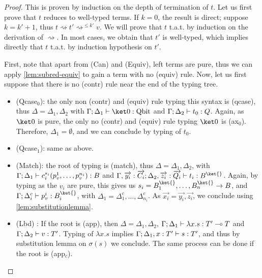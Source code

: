 \documentclass[10pt,a4paper]{article}
\newcommand{\bvar}{B}
\newcommand{\qvar}{Q}
\newcommand\bkvar{\bvar^{\ket{}}}
\newcommand{\bkvarb}{{\bkvar}}
\newcommand{\qbit}{\mathrm{Qbit}}
\newcommand{\linfunc}{\multimap}
\newcommand{\sign}[2]{\ifx&#1&
  \else
  #1 \to
  \fi
#2}
\newcommand{\zket}{\ket 0}
\newcommand{\lbd}[2]{\lambda #1 .#2}
\newcommand{\vartyping}[2]{#1 : #2}
\newcommand{\typing}[4]{
  \ifx&#1&\varnothing \else #1\fi; 
  \ifx&#2&\varnothing \else #2\fi 
  \vdash {#3} : #4
}
\newcommand{\reduces}{\rightsquigarrow}
\newcommand{\mostreduces}[1]{\ensuremath{\reduces^{\leq #1}}}
\begin{document}
\begin{proof}
  This is proven by induction on the depth of termination of $t$.
  Let us first prove that $t$ reduces to well-typed terms. If $k =
  0$, the result
  is direct; suppose $k = k' + 1$, thus $t \reduces t' \mostreduces{k'} v$.
  We will prove that $t$ t.a.t. by induction on the derivation
  of $\reduces$. In most cases, we obtain that $t'$ is
  well-typed, which implies directly that $t$ t.a.t. by
  induction hypothesis on $t'$.

  First, note that apart from (Can) and (Equiv), left terms are pure,
  thus we can apply \autoref{lem:subred-equiv} to gain a term with no
  (equiv) rule.
  Now, let us first suppose that there is no (contr) rule near the
  end of the typing tree.

  \begin{itemize}
    \item (Qcase$_0$): the only non (contr) and (equiv) rule typing
      this syntax is (qcase),
      thus $\Delta = \Delta_1, \Delta_2$ with $\typing \Gamma
      {\Delta_1} \zket \qbit$ and $\typing \Gamma {\Delta_2} {t_0} \qvar$.
      Again, as $\zket$ is pure, the only no (contr) and (equiv) rule
      typing $\zket$ is (ax$_0$).
      Therefore, $\Delta_1 = \emptyset$, and we can conclude by typing of $t_0$.

    \item (Qcase$_1$): same as above.

    \item (Match): the root of typing is (match), thus $\Delta =
      \Delta_1, \Delta_2$, with $\typing \Gamma {\Delta_1}
      {c_i^{s_i}(p_v^1, \dots, p_v^{n_i})} \bvar$
      and $\typing {\Gamma, \overrightarrow{y_i} :
      \overrightarrow{C_i}} {\Delta_2,
      \overrightarrow{z_i} : \overrightarrow{Q_i}} {t_i} \bkvarb$.
      Again, by typing as the $v_i$ are pure, this gives us $s_i = \sign
      {\bkvar_1, \dots, \bkvar_n} \bvar$, and $\typing \Gamma
      {\Delta_i^c} {p_v^i} \bkvar_i$,
      with $\Delta_1 = \Delta_1^c, \dots, \Delta_{n_i}^c$.
      As $\overrightarrow{x_i} = \overrightarrow{y_i},
      \overrightarrow{z_i}$, we conclude using
      \autoref{lem:substitutionlemma}.

    \item (Lbd) : If the root is (app), then $\Delta = \Delta_1,
      \Delta_2$, $\typing \Gamma {\Delta_1} {\lbd x s} T' \linfunc T$
      and $\typing \Gamma {\Delta_2} v T'$.
      Typing of $\lbd x s$ implies $\typing \Gamma {\Delta_1,
      \vartyping x T'} s T'$, and thus by substitution lemma on
      $\sigma(s)$ we conclude.
      The same process can be done if the root is (app$_c$).


\end{itemize}
\end{proof}
\end{document}
